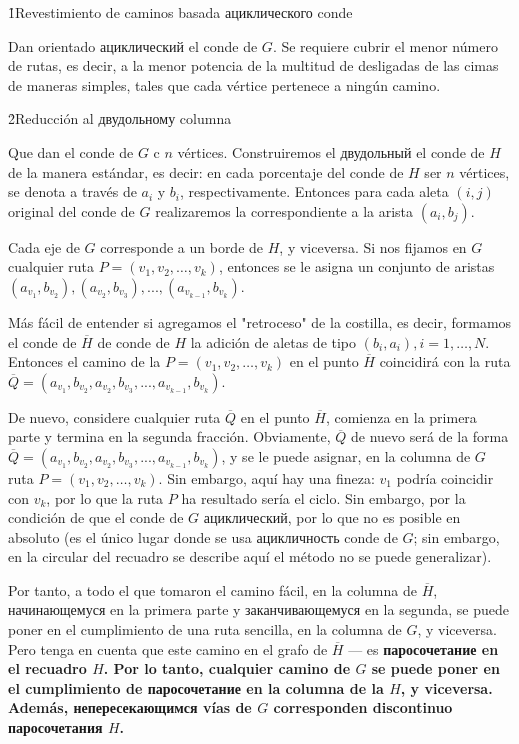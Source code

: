 \h1{Revestimiento de caminos basada ациклического conde}

Dan orientado ациклический el conde de $G$. Se requiere cubrir el menor número de rutas, es decir, a la menor potencia de la multitud de desligadas de las cimas de maneras simples, tales que cada vértice pertenece a ningún camino.


\h2{Reducción al двудольному columna}

Que dan el conde de $G$ c $n$ vértices. Construiremos el двудольный el conde de $H$ de la manera estándar, es decir: en cada porcentaje del conde de $H$ ser $n$ vértices, se denota a través de $a_i$ y $b_i$, respectivamente. Entonces para cada aleta $(i, j)$ original del conde de $G$ realizaremos la correspondiente a la arista $(a_i, b_j)$.

Cada eje de $G$ corresponde a un borde de $H$, y viceversa. Si nos fijamos en $G$ cualquier ruta $P = (v_1, v_2, \ldots, v_k)$, entonces se le asigna un conjunto de aristas $(a_{v_1}, b_{v_2}), (a_{v_2}, b_{v_3}), ..., (a_{v_{k-1}}, b_{v_k}) $.

Más fácil de entender si agregamos el "retroceso" de la costilla, es decir, formamos el conde de $\overline H$ de conde de $H$ la adición de aletas de tipo $(b_i, a_i), i=1, \ldots, N$. Entonces el camino de la $P = (v_1, v_2, \ldots, v_k)$ en el punto $\overline H$ coincidirá con la ruta $\overline Q = (a_{v_1}, b_{v_2}, a_{v_2}, b_{v_3}, ..., a_{v_{k-1}}, b_{v_k})$.

De nuevo, considere cualquier ruta $\overline Q$ en el punto $\overline H$, comienza en la primera parte y termina en la segunda fracción. Obviamente, $\overline Q$ de nuevo será de la forma $\overline Q = (a_{v_1}, b_{v_2}, a_{v_2}, b_{v_3}, ..., a_{v_{k-1}}, b_{v_k})$, y se le puede asignar, en la columna de $G$ ruta $P = (v_1, v_2, \ldots, v_k)$. Sin embargo, aquí hay una fineza: $v_1$ podría coincidir con $v_k$, por lo que la ruta $P$ ha resultado sería el ciclo. Sin embargo, por la condición de que el conde de $G$ ациклический, por lo que no es posible en absoluto (es el único lugar donde se usa ацикличность conde de $G$; sin embargo, en la circular del recuadro se describe aquí el método no se puede generalizar).

Por tanto, a todo el que tomaron el camino fácil, en la columna de $\overline H$, начинающемуся en la primera parte y заканчивающемуся en la segunda, se puede poner en el cumplimiento de una ruta sencilla, en la columna de $G$, y viceversa. Pero tenga en cuenta que este camino en el grafo de $\overline H$ --- es \bf{паросочетание} en el recuadro $H$. Por lo tanto, cualquier camino de $G$ se puede poner en el cumplimiento de паросочетание en la columna de la $H$, y viceversa. Además, непересекающимся vías de $G$ corresponden discontinuo паросочетания $H$.

